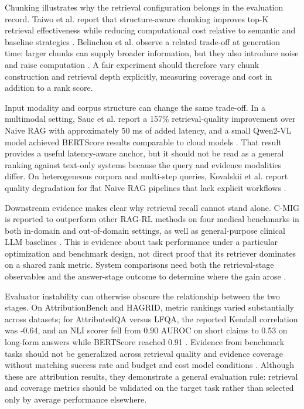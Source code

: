 \documentclass[a4paper,11pt]{article}
\begin{document}
Chunking illustrates why the retrieval configuration belongs in the evaluation record. Taiwo et al. report that structure-aware chunking improves top-K retrieval effectiveness while reducing computational cost relative to semantic and baseline strategies \citep{Taiwo2026Evaluating}. Belinchon et al. observe a related trade-off at generation time: larger chunks can supply broader information, but they also introduce noise and raise computation \citep{Belinchon2026Effect}. A fair experiment should therefore vary chunk construction and retrieval depth explicitly, measuring coverage and cost in addition to a rank score.

Input modality and corpus structure can change the same trade-off. In a multimodal setting, Sauc et al. report a 157\% retrieval-quality improvement over Naive RAG with approximately 50 ms of added latency, and a small Qwen2-VL model achieved BERTScore results comparable to cloud models \citep{Sauc2026Multimodal}. That result provides a useful latency-aware anchor, but it should not be read as a general ranking against text-only systems because the query and evidence modalities differ. On heterogeneous corpora and multi-step queries, Kovalskii et al. report quality degradation for flat Naive RAG pipelines that lack explicit workflows \citep{Kovalskii2026Domain}.

Downstream evidence makes clear why retrieval recall cannot stand alone. C-MIG is reported to outperform other RAG-RL methods on four medical benchmarks in both in-domain and out-of-domain settings, as well as general-purpose clinical LLM baselines \citep{Miao2026Multi}. This is evidence about task performance under a particular optimization and benchmark design, not direct proof that its retriever dominates on a shared rank metric. System comparisons need both the retrieval-stage observables and the answer-stage outcome to determine where the gain arose \citep{Miao2026Multi,Salemi2024Evaluating}.

Evaluator instability can otherwise obscure the relationship between the two stages. On AttributionBench and HAGRID, metric rankings varied substantially across datasets; for AttributedQA versus LFQA, the reported Kendall correlation was -0.64, and an NLI scorer fell from 0.90 AUROC on short claims to 0.53 on long-form answers while BERTScore reached 0.91 \citep{Ding2026Attribution}. Evidence from benchmark tasks should not be generalized across retrieval quality and evidence coverage without matching success rate and budget and cost model conditions \citep{Ding2026Attribution}. Although these are attribution results, they demonstrate a general evaluation rule: retrieval and coverage metrics should be validated on the target task rather than selected only by average performance elsewhere.
\end{document}
